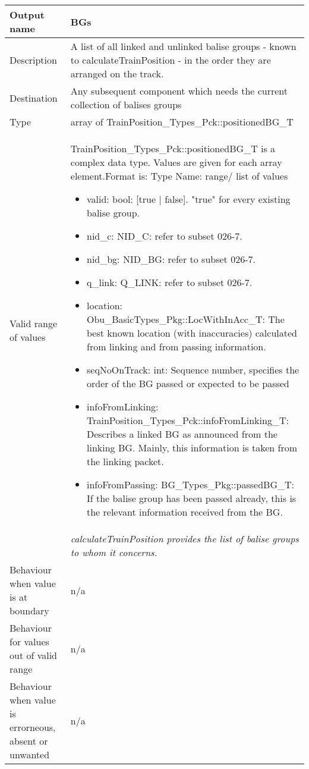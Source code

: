 \begin{longtable}{p{}p{}}
\toprule
Output name				& BGs \\

\midrule
Description				& A list of all linked and unlinked balise groups - known to calculateTrainPosition - in the order they are arranged on the track.  \newline
  \\
\midrule
Destination				& Any subsequent component which needs the current collection of balises groups \\ 
\midrule
Type					& array of TrainPosition\_Types\_Pck::positionedBG\_T \\  
\midrule
Valid range of values	& TrainPosition\_Types\_Pck::positionedBG\_T is a complex data type. Values are given for each array element.\newline Format is: Type Name: range/ list of values
\begin{itemize}
\item valid: bool: [true | false]. "true" for every existing balise group.
\item nid\_c: NID\_C: refer to subset 026-7. 
\item nid\_bg: NID\_BG: refer to subset 026-7. 
\item q\_link: Q\_LINK: refer to subset 026-7. 
\item location: Obu\_BasicTypes\_Pkg::LocWithInAcc\_T: The best known location (with inaccuracies) calculated from linking and from passing information.
\item seqNoOnTrack: int: Sequence number, specifies the order of the BG passed or expected to be passed
\item infoFromLinking: TrainPosition\_Types\_Pck::infoFromLinking\_T: Describes a linked BG as announced from the linking BG. Mainly, this information is taken from the linking packet.
\item infoFromPassing: BG\_Types\_Pkg::passedBG\_T: If the balise group has been passed already, this is the relevant information received from the BG.

\end{itemize}  \\

                     	&  \emph{calculateTrainPosition provides the list of balise groups to whom it concerns.}
\\

\midrule
Behaviour when value is at boundary	& n/a \\
\midrule
Behaviour for values out of valid range	& n/a \\

\midrule
Behaviour when value is errorneous, absent or unwanted & n/a \\

\bottomrule
\end{longtable}

